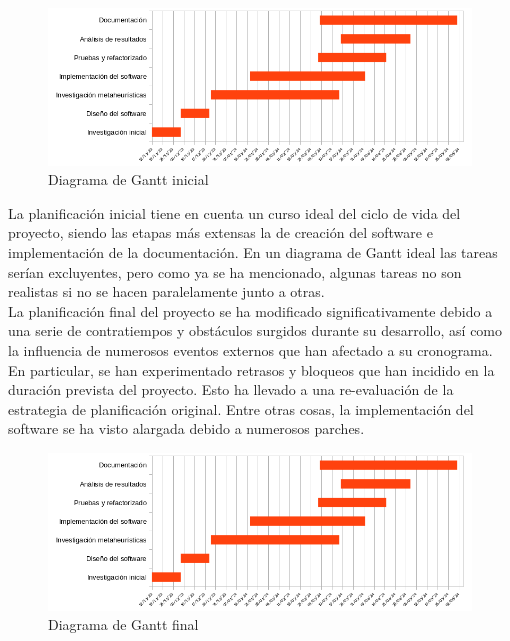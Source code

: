 \begin{figure}[H]
      \begin{center}
            \includegraphics[width=1\textwidth]{imagenes/gantt-init.png}
      \end{center}
      \caption{Diagrama de Gantt inicial}
\end{figure}

La planificación inicial tiene en cuenta un curso ideal del ciclo de vida del proyecto, siendo las etapas más extensas la de creación del software e implementación de la documentación. En un diagrama de Gantt ideal las tareas serían excluyentes, pero como ya se ha mencionado, algunas tareas no son realistas si no se hacen paralelamente junto a otras.\\[6pt]
La planificación final del proyecto se ha modificado significativamente debido a una serie de contratiempos y obstáculos surgidos durante su desarrollo, así como la influencia de numerosos eventos externos que han afectado a su cronograma. En particular, se han experimentado retrasos y bloqueos que han incidido en la duración prevista del proyecto. Esto ha llevado a una re-evaluación de la estrategia de planificación original. Entre otras cosas, la implementación del software se ha visto alargada debido a numerosos parches.

\begin{figure}[H]
      \begin{center}
            \includegraphics[width=1\textwidth]{imagenes/gantt-init.png}
      \end{center}
      \caption{Diagrama de Gantt final}
\end{figure}

